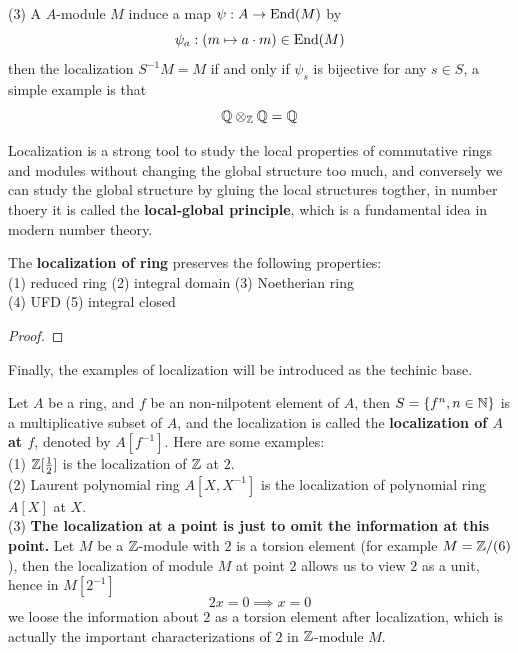 \documentclass[12pt,a4paper]{article}
\begin{document}
    (3) A \(A\)-module \(M\) induce a map \(\psi:A \to \operatorname{End}(M)\) by 
    \[\psi_a: (m \mapsto a\cdot m) \in \operatorname{End}(M)\]
    then the localization \(S^{-1}M = M \) if and only if \(\psi_s\) is bijective for any \(s \in S\), a simple example is that
    \[\mathbb{Q} \otimes_{\mathbb{Z}} \mathbb{Q} = \mathbb{Q}\]

    Localization is a strong tool to study the local properties of commutative rings and modules without changing the global structure too much, and conversely we can study the global structure by gluing the local structures togther, in number thoery it is called the \textbf{local-global principle}, which is a fundamental idea in modern number theory.

    \begin{proposition}
        The \textbf{localization of ring} preserves the following properties:\\
        (1) reduced ring \qquad (2) integral domain \qquad  (3) Noetherian ring\\ (4) UFD \qquad (5) integral closed
    \end{proposition}
    \begin{proof}
        
    \end{proof}

    Finally, the examples of localization will be introduced as the techinic base.

    \begin{example}
        Let \(A\) be a ring, and \(f\) be an non-nilpotent element of \(A\), then \(S = \{f^n, n \in \mathbb{N}\}\) is a multiplicative subset of \(A\), and the localization is called the \textbf{localization of \(A\) at \(f\)}, denoted by \(A[f^{-1}]\). Here are some examples:\\

        (1) \(\mathbb{Z}[\frac{1}{2}]\) is the localization of \(\mathbb{Z}\) at \(2\).\\

        (2) Laurent polynomial ring \(A[X,X^{-1}]\) is the localization of polynomial ring \(A[X]\) at \(X\).\\

        (3) \textbf{The localization at a point is just to omit the information at this point.} Let \(M\) be a \(\mathbb{Z}\)-module with \(2\) is a torsion element (for example \(M = \mathbb{Z}/(6)\)), then the localization of module \(M\) at point \(2\) allows us to view \(2\) as a unit, hence in \(M[2^{-1}]\)
        \[2x = 0 \implies x=0\]
        we loose the information about \(2\) as a torsion element after localization, which is actually the important characterizations of \(2\) in \(\mathbb{Z}\)-module \(M\).
    \end{example}
\end{document}
